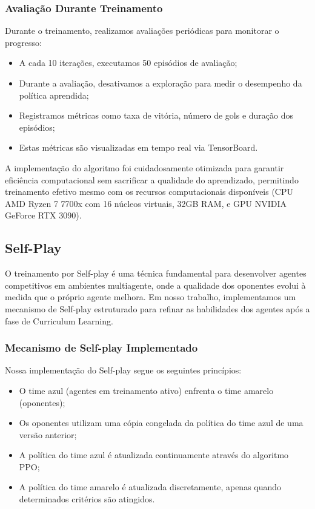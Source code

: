 \subsubsection{Avaliação Durante Treinamento}

Durante o treinamento, realizamos avaliações periódicas para monitorar o progresso:

\begin{itemize}
    \item A cada 10 iterações, executamos 50 episódios de avaliação;
    \item Durante a avaliação, desativamos a exploração para medir o desempenho da política aprendida;
    \item Registramos métricas como taxa de vitória, número de gols e duração dos episódios;
    \item Estas métricas são visualizadas em tempo real via TensorBoard.
\end{itemize}

A implementação do algoritmo foi cuidadosamente otimizada para garantir eficiência computacional sem sacrificar a qualidade do aprendizado, permitindo treinamento efetivo mesmo com os recursos computacionais disponíveis (CPU AMD Ryzen 7 7700x com 16 núcleos virtuais, 32GB RAM, e GPU NVIDIA GeForce RTX 3090).

\subsection{Self-Play}

O treinamento por Self-play é uma técnica fundamental para desenvolver agentes competitivos em ambientes multiagente, onde a qualidade dos oponentes evolui à medida que o próprio agente melhora. Em nosso trabalho, implementamos um mecanismo de Self-play estruturado para refinar as habilidades dos agentes após a fase de Curriculum Learning.

\subsubsection{Mecanismo de Self-play Implementado}

Nossa implementação do Self-play segue os seguintes princípios:

\begin{itemize}
    \item O time azul (agentes em treinamento ativo) enfrenta o time amarelo (oponentes);
    \item Os oponentes utilizam uma cópia congelada da política do time azul de uma versão anterior;
    \item A política do time azul é atualizada continuamente através do algoritmo PPO;
    \item A política do time amarelo é atualizada discretamente, apenas quando determinados critérios são atingidos.
\end{itemize}

